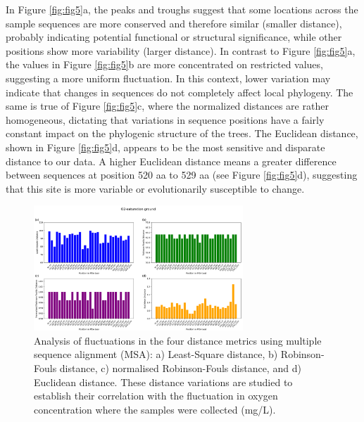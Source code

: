 In Figure \ref{fig:fig5}a, the peaks and troughs suggest that some locations across the sample sequences are more conserved and therefore similar (smaller distance), probably indicating potential functional or structural significance, while other positions show more variability (larger distance). In contrast to Figure \ref{fig:fig5}a, the values in Figure \ref{fig:fig5}b are more concentrated on restricted values, suggesting a more uniform fluctuation. In this context, lower variation may indicate that changes in sequences do not completely affect local phylogeny. The same is true of Figure \ref{fig:fig5}c, where the normalized distances are rather homogeneous, dictating that variations in sequence positions have a fairly constant impact on the phylogenic structure of the trees. The Euclidean distance, shown in Figure \ref{fig:fig5}d, appears to be the most sensitive and disparate distance to our data. A higher Euclidean distance means a greater difference between sequences at position 520 aa to 529 aa (see Figure \ref{fig:fig5}d), suggesting that this site is more variable or evolutionarily susceptible to change. 

\begin{figure}[]
    \centering
    \includegraphics[width=0.7\textwidth]{figure6.png}
    \caption{Analysis of fluctuations in the four distance metrics using multiple sequence alignment (MSA): a) Least-Square distance, b) Robinson-Fouls distance, c) normalised Robinson-Fouls distance, and d) Euclidean distance. These distance variations are studied to establish their correlation with the fluctuation in oxygen concentration where the samples were collected (mg/L). \label{fig:fig6}}
\end{figure}

